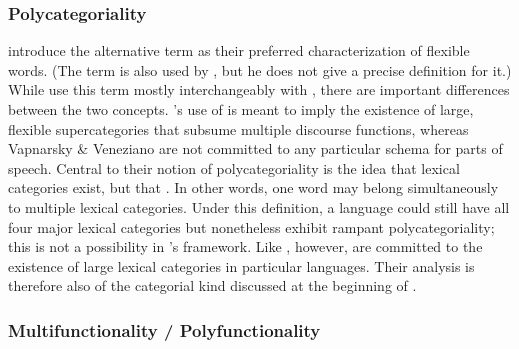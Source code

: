 \subsubsection{Polycategoriality}
\label{sec:2.3.1.2}

\textcite[4]{VapnarskyVeneziano2017a} introduce the alternative term  as their preferred characterization of flexible words. (The term is also used by \textcite{Carter2006}, but he does not give a precise definition for it.) While \citeauthor{VapnarskyVeneziano2017a} use this term mostly interchangeably with , there are important differences between the two concepts. \citeauthor{Hengeveld1992}'s use of  is meant to imply the existence of large, flexible supercategories that subsume multiple discourse functions, whereas Vapnarsky \& Veneziano are not committed to any particular schema for parts of speech. Central to their notion of polycategoriality is the idea that lexical categories exist, but that . In other words, one word may belong simultaneously to multiple lexical categories. Under this definition, a language could still have all four major lexical categories but nonetheless exhibit rampant polycategoriality; this is not a possibility in \citeauthor{Hengeveld1992}'s framework. Like \citeauthor{Hengeveld1992}, however, \citeauthor{VapnarskyVeneziano2017a} are committed to the existence of large lexical categories in particular languages. Their analysis is therefore also of the categorial kind discussed at the beginning of .

\subsubsection{Multifunctionality / Polyfunctionality}
\label{sec:2.3.1.3}

